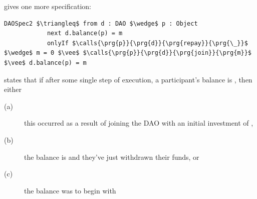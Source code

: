 \cite{OOPSLA22}  gives one more   specification: 
 
 \begin{lstlisting}[language = Chainmail, mathescape=true, frame=lines]
DAOSpec2 $\triangleq$ from d : DAO $\wedge$ p : Object
            next d.balance(p) = m
            onlyIf $\calls{\prg{p}}{\prg{d}}{\prg{repay}}{\prg{\_}}$ $\wedge$ m = 0 $\vee$ $\calls{\prg{p}}{\prg{d}}{\prg{join}}{\prg{m}}$ $\vee$ d.balance(p) = m
\end{lstlisting}

  states that if after some single step of execution, a participant's balance is , then 
either 
\begin{description}
\item[(a)] this occurred as a result of joining the DAO with an initial investment of , 
\item[(b)] the balance is  and they've just withdrawn their funds, or 
\item[(c) ]the balance was  to begin with
\end{description}

%
%


